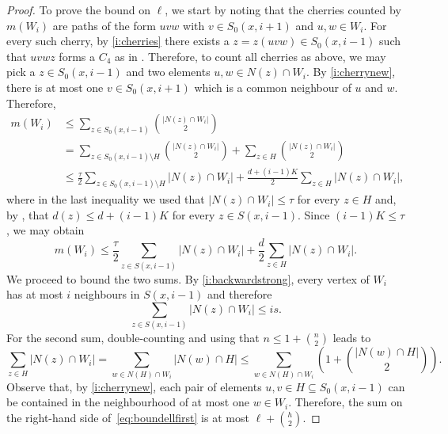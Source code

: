 \documentclass[reqno,a4paper,11pt]{amsart}
\theoremstyle{definition}
\renewcommand{\leq}{\leqslant}
\begin{document}
\begin{proof}
  To prove the bound on $\ell$, we start by noting that the cherries counted by $m(W_i)$ are paths of the form $uvw$ with $v \in S_0(x, i+1)$ and $u, w \in W_i$.
  For every such cherry, by \ref{i:cherries} there exists a $z=z(uvw) \in S_0(x, i-1)$ such that $uvwz$ forms a $C_4$ as in .
  Therefore, to count all cherries as above, we may pick a $z \in S_0(x, i-1)$ and two elements $u, w \in N(z) \cap W_i$.
  By \ref{i:cherrynew}, there is at most one $v \in S_0(x, i+1)$ which is a common neighbour of $u$ and $w$.
  Therefore,
  \begin{align*}
    m(W_i) &\leq \sum_{z \in S_0(x, i-1)} \binom{|N(z) \cap W_i|}{2}\\
           &= \sum_{z \in S_0(x, i-1) \setminus H} \binom{|N(z) \cap W_i|}{2} + \sum_{z \in H} \binom{|N(z) \cap W_i|}{2} \\
           &\leq \frac{\tau}{2} \sum_{z \in S_0(x, i-1) \setminus H} |N(z) \cap W_i| + \frac{d + (i-1)K}{2} \sum_{z \in H} |N(z) \cap W_i|,
  \end{align*}
  where in the last inequality we used that $|N(z) \cap W_i| \leq \tau$ for every $z \in H$ and, by , that $d(z) \leq d + (i-1)K$ for every $z \in S(x, i-1)$.
  Since $(i-1) K \leq \tau$, we may obtain
  \begin{equation}\label{e:cherries:firstbound}
    m(W_i) \leq \frac{\tau}{2} \sum_{z \in S(x, i-1)} |N(z) \cap W_i| + \frac{d}{2} \sum_{z \in H} |N(z) \cap W_i|.
  \end{equation}
  We proceed to bound the two sums.
  By \ref{i:backwardstrong}, every vertex of $W_i$ has at most $i$ neighbours in $S(x, i-1)$ and therefore
  \begin{equation}\label{eq:countneighboursz}
    \sum_{z \in S(x, i-1)} |N(z) \cap W_i| \leq is.
  \end{equation}
  For the second sum, double-counting and using that $n \leq 1+ \binom{n}{2}$ leads to
  \begin{equation}\label{eq:boundellfirst}
    \sum_{z \in H} |N(z) \cap W_i| = \sum_{w \in N(H) \cap W_i} |N(w) \cap H| \leq \sum_{w \in N(H) \cap W_i} \left(1 + \binom{|N(w) \cap H|}{2}\right).
  \end{equation}
  Observe that, by \ref{i:cherrynew}, each pair of elements $u, v \in H \subseteq S_0(x, i-1)$ can be contained in the neighbourhood of at most one $w \in W_i$.
  Therefore, the sum on the right-hand side of~\eqref{eq:boundellfirst} is at most $\ell + \binom{h}{2}$.

\end{proof}
\end{document}
